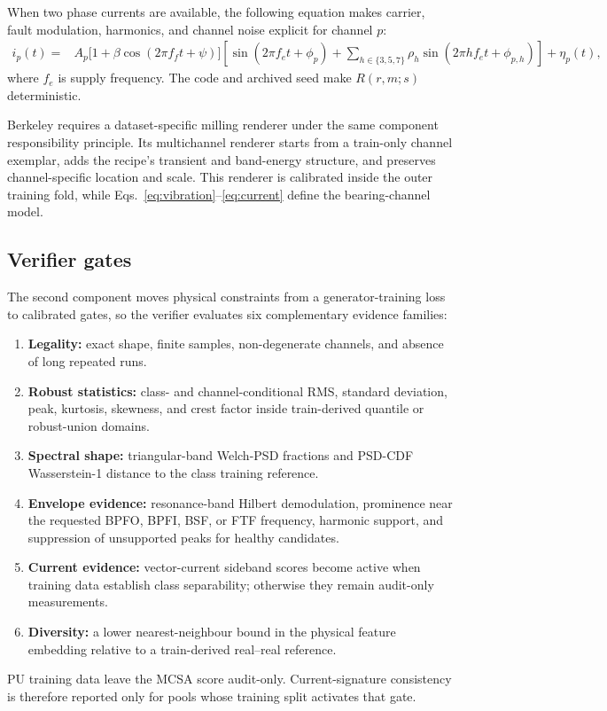 \documentclass[a4paper,fleqn]{cas-sc}
\begin{document}
When two phase currents are available, the following equation makes carrier,
fault modulation, harmonics, and channel noise explicit for channel $p$:
\begin{align}
i_p(t)={}&A_p\bigl[1+\beta\cos(2\pi f_ft+\psi)\bigr]
\left[\sin(2\pi f_et+\phi_p)
+\sum_{h\in\{3,5,7\}}\rho_h\sin(2\pi hf_et+\phi_{p,h})\right]
+\eta_p(t),
\label{eq:current}
\end{align}
where $f_e$ is supply frequency. The code and archived seed make $R(r,m;s)$
deterministic.

Berkeley requires a dataset-specific milling renderer under the same component
responsibility principle. Its multichannel renderer starts from a train-only
channel exemplar, adds the recipe's transient and band-energy structure, and
preserves channel-specific location and scale. This renderer is calibrated
inside the outer training fold, while
Eqs.~\eqref{eq:vibration}--\eqref{eq:current} define the bearing-channel model.

\subsection{Verifier gates}

The second component moves physical constraints from a generator-training loss
to calibrated gates, so the verifier evaluates six complementary evidence
families:
\begin{enumerate}
  \item \textbf{Legality:} exact shape, finite samples, non-degenerate
  channels, and absence of long repeated runs.
  \item \textbf{Robust statistics:} class- and channel-conditional RMS,
  standard deviation, peak, kurtosis, skewness, and crest factor inside
  train-derived quantile or robust-union domains.
  \item \textbf{Spectral shape:} triangular-band Welch-PSD fractions and
  PSD-CDF Wasserstein-1 distance to the class training reference.
  \item \textbf{Envelope evidence:} resonance-band Hilbert demodulation,
  prominence near the requested BPFO, BPFI, BSF, or FTF frequency, harmonic support,
  and suppression of unsupported peaks for healthy candidates.
  \item \textbf{Current evidence:} vector-current sideband scores become active
  when training data establish class separability; otherwise they remain
  audit-only measurements.
  \item \textbf{Diversity:} a lower nearest-neighbour bound in the physical
  feature embedding relative to a train-derived real--real reference.
\end{enumerate}
PU training data leave the MCSA score audit-only. Current-signature consistency
is therefore reported only for pools whose training split activates that gate.
\end{document}
